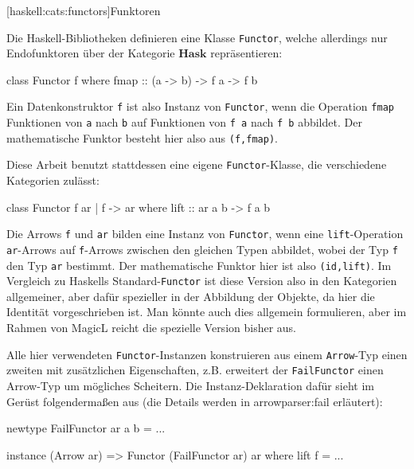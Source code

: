 \documentclass[12pt, a4paper, bibgerm]{scrbook}
\newenvironment{DIFnomarkup}{}{}
\newcommand\icode[1]{\lstinline?#1?}
\newcommand\lsubsection{}
\newcommand\sref{}
\begin{document}
\lsubsection[haskell:cats:functors]{Funktoren}

Die Haskell-Bibliotheken definieren eine Klasse \icode{Functor}, welche
allerdings nur Endofunktoren über der Kategorie $\mathbf{Hask}$ repräsentieren:
\begin{DIFnomarkup}\begin{code}
class Functor f where
  fmap :: (a -> b) -> f a -> f b
\end{code}\end{DIFnomarkup}
Ein Datenkonstruktor \icode{f} ist also Instanz von \icode{Functor},
wenn die Operation \icode{fmap} Funktionen von \icode{a} nach \icode{b}
auf Funktionen von \icode{f a} nach \icode{f b} abbildet. Der
mathematische Funktor besteht hier also aus \icode{(f,fmap)}.

Diese Arbeit benutzt stattdessen eine eigene \icode{Functor}-Klasse,
die verschiedene Kategorien zulässt:
\begin{DIFnomarkup}\begin{code}
class Functor f ar | f -> ar where
  lift :: ar a b -> f a b
\end{code}\end{DIFnomarkup}
Die Arrows \icode{f} und \icode{ar} bilden eine Instanz von
\icode{Functor}, wenn eine \icode{lift}-Operation \icode{ar}-Arrows auf
\icode{f}-Arrows zwischen den gleichen Typen abbildet, wobei der Typ
\icode{f} den Typ \icode{ar} bestimmt. Der mathematische Funktor
hier ist also \icode{(id,lift)}. Im Vergleich zu Haskells
Standard-\icode{Functor} ist diese Version also in den Kategorien
allgemeiner, aber dafür spezieller in der Abbildung der Objekte, da hier
die Identität vorgeschrieben ist. Man könnte auch dies allgemein
formulieren, aber im Rahmen von MagicL reicht die spezielle Version
bisher aus.

Alle hier verwendeten \icode{Functor}-Instanzen konstruieren aus einem
\icode{Arrow}-Typ einen zweiten mit zusätzlichen Eigenschaften,
z.B. erweitert der \icode{FailFunctor} einen Arrow-Typ um mögliches
Scheitern. Die Instanz-Deklaration dafür sieht im Gerüst folgendermaßen
aus (die Details werden in \sref{arrowparser:fail} erläutert):
\begin{DIFnomarkup}\begin{code}
newtype FailFunctor ar a b = ...

instance (Arrow ar) => Functor (FailFunctor ar) ar where
  lift f = ...
\end{code}\end{DIFnomarkup}
\end{document}

